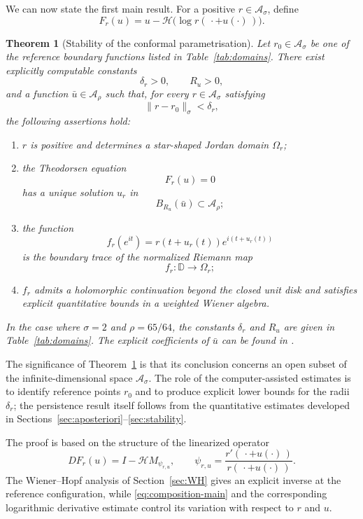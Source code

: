 \documentclass[11pt,a4paper]{amsart}
\newtheorem{theorem}{Theorem}[section]
\begin{document}
We can now state the first main result. For a positive
$r\in\mathcal A_\sigma$, define
\[
F_r(u)
=
u-\mathcal H\bigl(\log r(\,\cdot+u(\cdot)\,)\bigr).
\]

\begin{theorem}[Stability of the conformal parametrisation]
	\label{thm:conformal-stability}
	Let $r_0\in\mathcal A_\sigma$ be one of the reference boundary
	functions listed in Table~\ref{tab:domains}. There exist explicitly
	computable constants
	\[
	\delta_r>0,\qquad R_u>0,
	\]
	and a function $\bar u\in\mathcal A_\rho$ such that, for every
	$r\in\mathcal A_\sigma$ satisfying
	\[
	\|r-r_0\|_\sigma<\delta_r,
	\]
	the following assertions hold:
	\begin{enumerate}
		\item $r$ is positive and determines a star-shaped Jordan domain
		$\Omega_r$;
		
		\item the Theodorsen equation
		\[
		F_r(u)=0
		\]
		has a unique solution $u_r$ in
		\[
		B_{R_u}(\bar u)\subset\mathcal A_\rho;
		\]
		
		\item the function
		\[
		f_r(e^{it})
		=
		r(t+u_r(t))e^{i(t+u_r(t))}
		\]
		is the boundary trace of the normalized Riemann map
		\[
		f_r:\mathbb D\longrightarrow\Omega_r;
		\]
		
		\item $f_r$ admits a holomorphic continuation beyond the closed unit
		disk and satisfies explicit quantitative bounds in a weighted
		Wiener algebra.
	\end{enumerate}
	In the case where $\sigma=2$ and $\rho=65/64$, the constants $\delta_r$ and $R_u$ are given in Table~\ref{tab:domains}. The explicit coefficients of $\bar u$ can be found in \cite{program}.
\end{theorem}

The significance of Theorem~\ref{thm:conformal-stability} is that its
conclusion concerns an open subset of the infinite-dimensional space
$\mathcal A_\sigma$. The role of the computer-assisted estimates is to
identify reference points $r_0$ and to produce
explicit lower bounds for the radii $\delta_r$; the persistence result
itself follows from the quantitative estimates developed in
Sections~\ref{sec:aposteriori}--\ref{sec:stability}.

The proof is based on the structure of the linearized operator
\[
D F_r(u)
=
I-\mathcal H M_{\psi_{r,u}},
\qquad
\psi_{r,u}
=
\frac{r'(\,\cdot+u(\cdot)\,)}
{r(\,\cdot+u(\cdot)\,)}.
\]
The Wiener--Hopf analysis of Section~\ref{sec:WH} gives an explicit inverse at the
reference configuration, while
\eqref{eq:composition-main} and the corresponding logarithmic
derivative estimate control its variation with respect to $r$ and
$u$.
\end{document}
